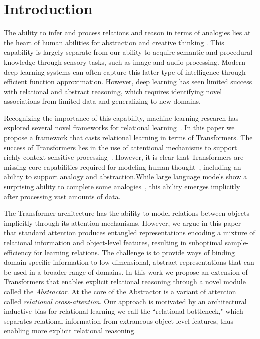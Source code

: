 \section{Introduction}

The ability to infer and process relations and reason in terms of analogies lies at the heart of human abilities for abstraction and creative thinking
\citep{snow,holyoak}. This capability is largely separate from our ability to acquire semantic and procedural knowledge through sensory tasks, such as image and audio processing. Modern deep learning systems can often capture this latter type of intelligence through efficient function approximation. However, deep learning has seen limited success with relational and abstract reasoning, which requires identifying novel associations from limited data and generalizing to new domains.

Recognizing the importance of this capability, machine learning research has explored several novel frameworks for relational learning~\citep{TEM, NTM,episodicControl,shanahanExplicitlyRelationalNeural,esbn,mondal23learned,battaglia,barrett:2018,santoro1}. In this paper we propose a framework that casts relational learning in terms of Transformers. The success of Transformers lies in the use of attentional mechanisms to support richly context-sensitive processing~\citep{transformers,vaswani2017attention,kerg2020untangling}. However, it is clear that Transformers are missing core capabilities required for modeling human thought~\citep{mahowald2023dissociating}, including an ability to support analogy and abstraction.While large language models show a surprising ability to complete some analogies~\citep{webb}, this ability emerges implicitly after processing vast amounts of data.

The Transformer architecture has the ability to model relations between objects implicitly through its attention mechanisms. However, we argue in this paper that standard attention produces entangled representations encoding a mixture of relational information and object-level features, resulting in suboptimal sample-efficiency for learning relations. The challenge is to provide ways of binding domain-specific information to low dimensional, abstract representations that can be used in a broader range of domains. In this work we propose an extension of Transformers that enables explicit relational reasoning through a novel module called the \textit{Abstractor}. At the core of the Abstractor is a variant of attention called \textit{relational cross-attention}. Our approach is motivated by an architectural inductive bias for relational learning we call the ``relational bottleneck," which separates relational information from extraneous object-level features, thus enabling more explicit relational reasoning. %

